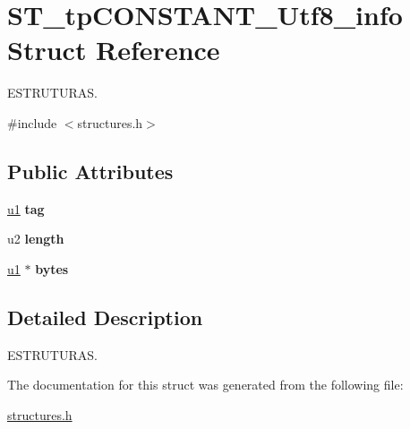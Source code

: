 \hypertarget{structST__tpCONSTANT__Utf8__info}{}\section{S\+T\+\_\+tp\+C\+O\+N\+S\+T\+A\+N\+T\+\_\+\+Utf8\+\_\+info Struct Reference}
\label{structST__tpCONSTANT__Utf8__info}


E\+S\+T\+R\+U\+T\+U\+R\+AS.  




{\ttfamily \#include $<$structures.\+h$>$}

\subsection*{Public Attributes}
\begin{DoxyCompactItemize}
\item 
\mbox{\label{structST__tpCONSTANT__Utf8__info_add15d24b50136f76790a4a5710580ea1}} 
\mbox{\hyperlink{structures_8h_ad9f4cdb6757615aae2fad89dab3c5470}{u1}} {\bfseries tag}
\item 
\mbox{\label{structST__tpCONSTANT__Utf8__info_adb54c0d42d0a2bdb40209422fea6de6b}} 
u2 {\bfseries length}
\item 
\mbox{\label{structST__tpCONSTANT__Utf8__info_aa083f24fea3a9a4dd1bd10d5b91db70c}} 
\mbox{\hyperlink{structures_8h_ad9f4cdb6757615aae2fad89dab3c5470}{u1}} $\ast$ {\bfseries bytes}
\end{DoxyCompactItemize}


\subsection{Detailed Description}
E\+S\+T\+R\+U\+T\+U\+R\+AS. 

The documentation for this struct was generated from the following file\+:\begin{DoxyCompactItemize}
\item 
\mbox{\hyperlink{structures_8h}{structures.\+h}}\end{DoxyCompactItemize}
